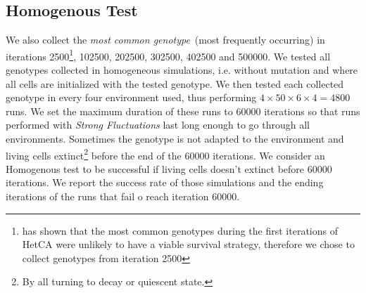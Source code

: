 \subsection{Homogenous Test}
We also collect the \emph{most common genotype}~(most frequently occurring) in iterations 2500\footnote{\citep{medernach2015evolutionary}  has shown that the most common genotypes during the first iterations of HetCA were unlikely to have a viable survival strategy, therefore we chose to collect genotypes from iteration 2500}, 102500, 202500, 302500, 402500 and 500000. We tested all genotypes collected in homogeneous simulations, i.e. without mutation and where all cells are initialized with the tested genotype. We then tested each collected genotype in every four environment used, thus performing $4\times50\times6\times4=4800$ runs. We set the maximum duration of these runs to 60000 iterations so that runs performed with \emph{Strong Fluctuations} last long enough to go through all environments. Sometimes the genotype is not adapted to the environment and living cells extinct\footnote{By all turning to decay or quiescent state.} before the end of the 60000 iterations. We consider an Homogenous test to be successful if living cells doesn't extinct before 60000 iterations. We report the success rate of those simulations and the ending iterations of the runs that fail o reach iteration 60000. 

